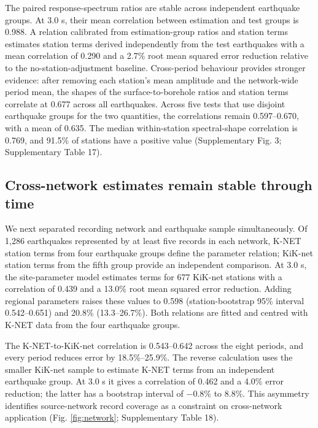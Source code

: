 \documentclass[11pt]{article}
\begin{document}
The paired response-spectrum ratios are stable across independent earthquake groups. At 3.0 s, their mean correlation between estimation and test groups is 0.988. A relation calibrated from estimation-group ratios and station terms estimates station terms derived independently from the test earthquakes with a mean correlation of 0.290 and a 2.7\% root mean squared error reduction relative to the no-station-adjustment baseline. Cross-period behaviour provides stronger evidence: after removing each station's mean amplitude and the network-wide period mean, the shapes of the surface-to-borehole ratios and station terms correlate at 0.677 across all earthquakes. Across five tests that use disjoint earthquake groups for the two quantities, the correlations remain 0.597--0.670, with a mean of 0.635. The median within-station spectral-shape correlation is 0.769, and 91.5\% of stations have a positive value (Supplementary Fig. 3; Supplementary Table 17).

\subsection{Cross-network estimates remain stable through time}

We next separated recording network and earthquake sample simultaneously. Of 1,286 earthquakes represented by at least five records in each network, K-NET station terms from four earthquake groups define the parameter relation; KiK-net station terms from the fifth group provide an independent comparison. At 3.0 s, the site-parameter model estimates terms for 677 KiK-net stations with a correlation of 0.439 and a 13.0\% root mean squared error reduction. Adding regional parameters raises these values to 0.598 (station-bootstrap 95\% interval 0.542--0.651) and 20.8\% (13.3--26.7\%). Both relations are fitted and centred with K-NET data from the four earthquake groups.

The K-NET-to-KiK-net correlation is 0.543--0.642 across the eight periods, and every period reduces error by 18.5\%--25.9\%. The reverse calculation uses the smaller KiK-net sample to estimate K-NET terms from an independent earthquake group. At 3.0 s it gives a correlation of 0.462 and a 4.0\% error reduction; the latter has a bootstrap interval of $-0.8\%$ to 8.8\%. This asymmetry identifies source-network record coverage as a constraint on cross-network application (Fig. \ref{fig:network}; Supplementary Table 18).
\end{document}
